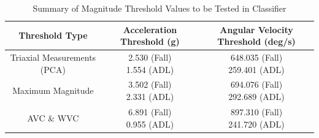 \documentclass{llncs}
\begin{document}
	
 \begin{table}
 	\begin{center}
		\caption{Summary of Magnitude Threshold Values to be Tested in Classifier}
		\label{table4}
		\begin{tabular}{|c|c|c|}
			\toprule
			Threshold Type & Acceleration Threshold (g) & Angular Velocity Threshold (deg/s)\\
			\midrule
			Triaxial Measurements (PCA) & \makecell{2.530 (Fall) \\1.554 (ADL)} & \makecell{648.035 (Fall) \\259.401 (ADL)}\\
			\midrule
			Maximum Magnitude & \makecell{3.502 (Fall) \\2.331 (ADL)} & \makecell{694.076 (Fall) \\292.689 (ADL)}\\
			\midrule
			AVC \& WVC & \makecell{6.891 (Fall) \\0.955 (ADL)} & \makecell{897.310 (Fall) \\241.720 (ADL)}\\
			\bottomrule
		\end{tabular}
 	\end{center}
\end{table} 
\end{document}

